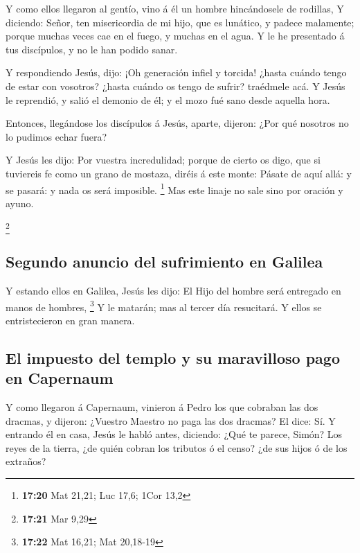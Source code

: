  Y como ellos llegaron al gentío, vino á él un hombre
hincándosele de rodillas,  Y diciendo: Señor, ten
misericordia de mi hijo, que es lunático, y padece malamente; porque
muchas veces cae en el fuego, y muchas en el agua.  Y le
he presentado á tus discípulos, y no le han podido sanar.

 Y respondiendo Jesús, dijo: ¡Oh generación infiel y
torcida! ¿hasta cuándo tengo de estar con vosotros? ¿hasta cuándo os
tengo de sufrir? traédmele acá.  Y Jesús le reprendió, y
salió el demonio de él; y el mozo fué sano desde aquella hora.

 Entonces, llegándose los discípulos á Jesús, aparte,
dijeron: ¿Por qué nosotros no lo pudimos echar fuera?

 Y Jesús les dijo: Por vuestra incredulidad; porque de
cierto os digo, que si tuviereis fe como un grano de mostaza, diréis á
este monte: Pásate de aquí allá: y se pasará: y nada os será imposible.
\footnote{\textbf{17:20} Mat 21,21; Luc 17,6; 1Cor 13,2} 
Mas este linaje no sale sino por oración y ayuno.

\footnote{\textbf{17:21} Mar 9,29}

\hypertarget{segundo-anuncio-del-sufrimiento-en-galilea}{%
\subsection{Segundo anuncio del sufrimiento en
Galilea}\label{segundo-anuncio-del-sufrimiento-en-galilea}}

 Y estando ellos en Galilea, Jesús les dijo: El Hijo del
hombre será entregado en manos de hombres, \footnote{\textbf{17:22} Mat
  16,21; Mat 20,18-19}  Y le matarán; mas al tercer día
resucitará. Y ellos se entristecieron en gran manera.

\hypertarget{el-impuesto-del-templo-y-su-maravilloso-pago-en-capernaum}{%
\subsection{El impuesto del templo y su maravilloso pago en
Capernaum}\label{el-impuesto-del-templo-y-su-maravilloso-pago-en-capernaum}}

 Y como llegaron á Capernaum, vinieron á Pedro los que
cobraban las dos dracmas, y dijeron: ¿Vuestro Maestro no paga las dos
dracmas?  El dice: Sí. Y entrando él en casa, Jesús le
habló antes, diciendo: ¿Qué te parece, Simón? Los reyes de la tierra,
¿de quién cobran los tributos ó el censo? ¿de sus hijos ó de los
extraños?


